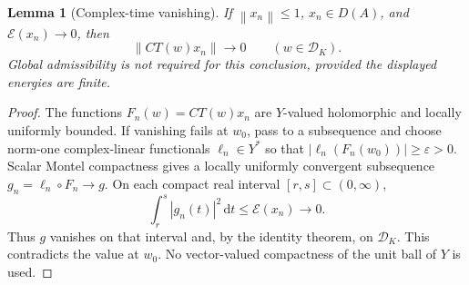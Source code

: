 \documentclass[11pt,a4paper]{article}
\newtheorem{lemma}[theorem]{Lemma}
\theoremstyle{definition}\newtheorem{definition}[theorem]{Definition}
\theoremstyle{remark}\newtheorem{remark}[theorem]{Remark}
\newcommand{\E}{\mathcal E}\newcommand{\D}{\mathcal D}
\newcommand{\dd}{\,\mathrm d}
\newcommand{\norm}[1]{\left\lVert #1\right\rVert}
\begin{document}
\begin{lemma}[Complex-time vanishing]\label{complex}
If $\norm{x_n}\le1$, $x_n\in D(A)$, and $\E(x_n)\to0$, then
\[
 \norm{CT(w)x_n}\longrightarrow0\qquad(w\in\D_K).
\]
Global admissibility is not required for this conclusion, provided the displayed energies are finite.
\end{lemma}
\begin{proof}
The functions $F_n(w)=CT(w)x_n$ are $Y$-valued holomorphic and locally uniformly bounded. If vanishing fails at $w_0$, pass to a subsequence and choose norm-one complex-linear functionals $\ell_n\in Y^*$ so that $|\ell_n(F_n(w_0))|\ge\varepsilon>0$. Scalar Montel compactness gives a locally uniformly convergent subsequence $g_n=\ell_n\circ F_n\to g$. On each compact real interval $[r,s]\subset(0,\infty)$,
\[
 \int_r^s |g_n(t)|^2\dd t\le\E(x_n)\to0.
\]
Thus $g$ vanishes on that interval and, by the identity theorem, on $\D_K$. This contradicts the value at $w_0$. No vector-valued compactness of the unit ball of $Y$ is used.
\end{proof}
\end{document}
